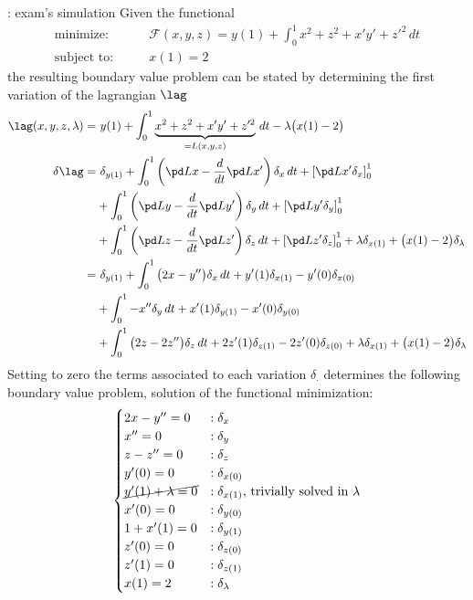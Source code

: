 \begin{example}{: exam's simulation}
	Given the functional
	\begin{align*}
		\textrm{minimize:} \qquad &\mathcal F(x,y,z) = y(1) + \int_0^1 x^2 + z^2 +x'y' +z'^2 \, dt \\
		\textrm{subject to:}  \qquad &x(1) = 2
	\end{align*}
	the resulting boundary value problem can be stated by determining the first variation of the lagrangian $\lag$ 
	\begin{align*}
		\lag(x,y,z,\lambda) =  & \ y(1) + \int_0^1 \underbrace{x^2 + z^2 +x'y' +z'^2}_{=L(x,y,z)}\, dt - \lambda\big(x(1) - 2\big) \\
		\delta \lag  = & \ \delta_{y(1)} + \int_0^1 \left( \pd L x - \frac d{dt}\pd L{x'} \right) \delta_x\, dt + \left[ \pd L {x'} \delta_x \right]_0^1 \\ & + \int_0^1 \left( \pd L y - \frac d{dt}\pd L{y'} \right) \delta_y\, dt + \left[ \pd L {y'} \delta_y \right]_0^1 \\ & + \int_0^1 \left( \pd L z - \frac d{dt}\pd L{z'} \right) \delta_z\, dt + \left[ \pd L {z'} \delta_z \right]_0^1 
		+\lambda \delta_{x(1)} + \big(x(1)-2\big) \delta_\lambda \\
		= & \  \delta_{y(1)} + \int_0^1 \big( 2x - y'' \big) \delta_x\, dt + y'(1)\delta_{x(1)} - y'(0)\delta_{x(0)} \\ &  + \int_0^1 -x'' \delta_y \, dt + x'(1) \delta_{y(1)} - x'(0) \delta_{y(0)} \\ & + \int_0^1 \big(2z - 2z''\big)\delta_z\, dt + 2z'(1) \delta_{z(1)} - 2z'(0) \delta_{z(0)} + \lambda \delta_{x(1)} + \big(x(1)-2\big) \delta_\lambda
	\end{align*} 
	Setting to zero the terms associated to each variation $\delta_\cdot$ determines the following boundary value problem, solution of the functional minimization:
	\[ \begin{cases}
		2x - y'' = 0 & : \delta_x \\
		x'' = 0 & : \delta_y \\
		z - z'' = 0 & : \delta_z \\
		y'(0) = 0 & : \delta_{x(0)} \\
		\cancel{y'(1) + \lambda = 0} & : \delta_{x(1)} \textrm{, trivially solved in } \lambda \\
		x'(0) = 0 & : \delta_{y(0)} \\
		1 + x'(1) = 0 & : \delta_{y(1)} \\
		z'(0) = 0 & : \delta_{z(0)} \\
		z'(1) = 0 & : \delta_{z(1)} \\
		x(1) = 2 & : \delta_\lambda
	\end{cases} \]
	

\end{example}


